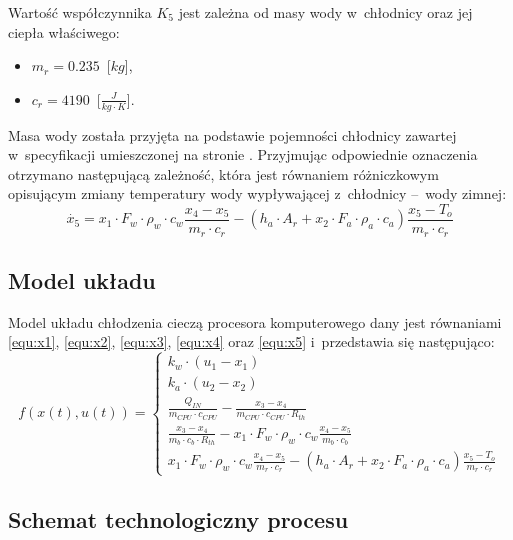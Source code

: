 Wartość współczynnika $K_5$ jest zależna od masy wody w~chłodnicy oraz jej
ciepła właściwego:
\begin{itemize}
    \item $m_r = 0.235$~[$kg$],
    \item $c_r = 4190$~[$\frac{J}{kg \cdot K}$].
\end{itemize}
Masa wody została przyjęta na podstawie pojemności chłodnicy zawartej
w~specyfikacji umieszczonej na stronie \cite{EKWBradiator}. Przyjmując
odpowiednie oznaczenia otrzymano następującą zależność, która jest równaniem
różniczkowym opisującym zmiany temperatury wody wypływającej z~chłodnicy --~wody
zimnej:
\begin{equation}
    \dot{x_5} = x_1 \cdot F_w \cdot \rho_w \cdot c_w \frac{x_4 - x_5}{m_r \cdot
    c_r} - \left( h_a \cdot A_r + x_2 \cdot F_a \cdot \rho_a \cdot c_a \right)
    \frac{x_5 - T_o}{m_r \cdot c_r}
    \label{equ:x5}
\end{equation}

\subsection{Model układu}
\indent

Model układu chłodzenia cieczą procesora komputerowego dany jest równaniami
\eqref{equ:x1}, \eqref{equ:x2}, \eqref{equ:x3}, \eqref{equ:x4} oraz
\eqref{equ:x5} i~przedstawia się następująco:
\begin{equation}
    f\left( x\left( t \right), u\left( t \right) \right) =
    \begin{cases}
        k_w \cdot \left( u_1 - x_1 \right)\\
        k_a \cdot \left( u_2 - x_2 \right)\\
        \frac{Q_{IN}}{m_{CPU} \cdot c_{CPU}} - \frac{x_3 - x_4}{m_{CPU} \cdot
        c_{CPU} \cdot R_{th}}\\
        \frac{x_3 - x_4}{m_b \cdot c_b \cdot R_{th}} - x_1 \cdot F_w \cdot
        \rho_w \cdot c_w \frac{x_4 - x_5}{m_b \cdot c_b}\\
        x_1 \cdot F_w \cdot \rho_w \cdot c_w \frac{x_4 - x_5}{m_r \cdot c_r} -
        \left( h_a \cdot A_r + x_2 \cdot F_a \cdot \rho_a \cdot c_a \right)
        \frac{x_5 - T_o}{m_r \cdot c_r}
    \end{cases}
    \label{equ:model}
\end{equation}

\newpage
\subsection{Schemat technologiczny procesu}
\indent

